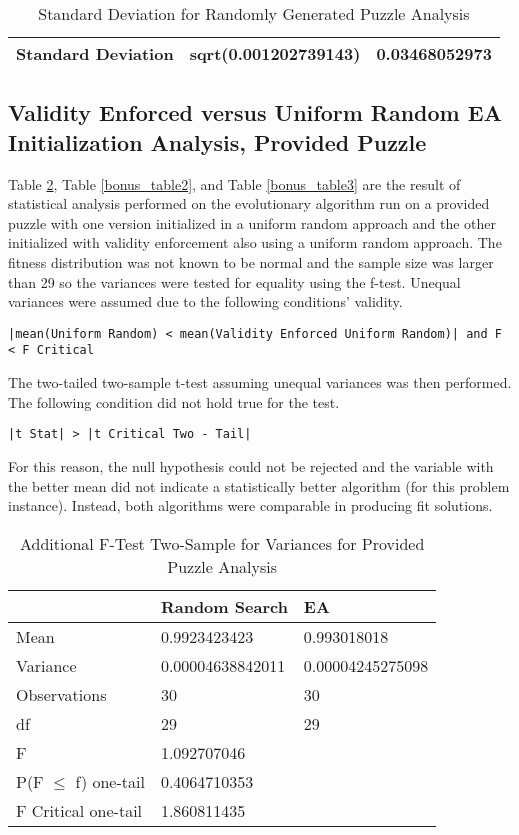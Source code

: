 \documentclass[11pt]{article}
\begin{document}
\begin{table}[H]
\centering
\caption{Standard Deviation for Randomly Generated Puzzle Analysis}
\label{my-label}
\begin{tabular}{|l|l|l|}
\hline
Standard Deviation & sqrt(0.001202739143) & 0.03468052973 \\ \hline
\end{tabular}
\end{table}


\subsection{Validity Enforced versus Uniform Random EA Initialization Analysis, Provided Puzzle}

Table \ref{bonus_table1}, Table \ref{bonus_table2}, and Table \ref{bonus_table3} are the result of statistical analysis performed on the 
evolutionary algorithm run on a provided puzzle with one version initialized in a 
uniform random approach and the other initialized with validity enforcement also using 
a uniform random approach. The fitness distribution was not known to be normal 
and the sample size was larger than 29 so the variances were tested for 
equality using the f-test. Unequal variances were assumed due to the following 
conditions' validity.

\begin{center}
\texttt{|mean(Uniform Random) < mean(Validity Enforced Uniform Random)| and F < F Critical}
\end{center}

The two-tailed two-sample t-test assuming unequal variances was then performed. The following condition did not hold true for the test.

\begin{center}
\texttt{|t Stat| > |t Critical Two - Tail|}
\end{center}

For this reason, the null hypothesis could not be rejected and the variable with the better mean did not indicate a statistically better algorithm (for this problem instance). Instead, both algorithms were comparable in producing fit solutions.


\begin{table}[H]
\centering
\caption{Additional F-Test Two-Sample for Variances for Provided Puzzle Analysis}
\label{bonus_table1}
\begin{tabular}{l|l|l}
 & Random Search & EA \\ \hline
Mean & 0.9923423423 & 0.993018018 \\
Variance & 0.00004638842011 & 0.00004245275098 \\
Observations & 30 & 30 \\
df & 29 & 29 \\
F & 1.092707046 &  \\
P(F $\leq$ f) one-tail & 0.4064710353 &  \\
F Critical one-tail & 1.860811435 & 
\end{tabular}
\end{table}
\end{document}

